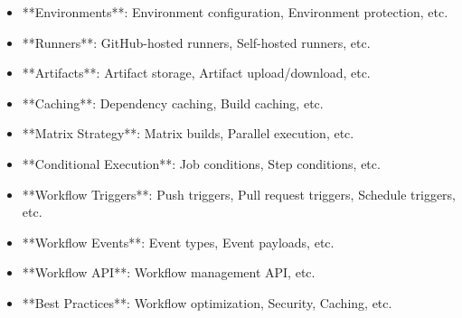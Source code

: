 \documentclass[11pt,a4paper]{article}
\begin{document}
\begin{itemize}
\item **Environments**: Environment configuration, Environment protection, etc.
\end{itemize}

\begin{itemize}
\item **Runners**: GitHub-hosted runners, Self-hosted runners, etc.
\end{itemize}

\begin{itemize}
\item **Artifacts**: Artifact storage, Artifact upload/download, etc.
\end{itemize}

\begin{itemize}
\item **Caching**: Dependency caching, Build caching, etc.
\end{itemize}

\begin{itemize}
\item **Matrix Strategy**: Matrix builds, Parallel execution, etc.
\end{itemize}

\begin{itemize}
\item **Conditional Execution**: Job conditions, Step conditions, etc.
\end{itemize}

\begin{itemize}
\item **Workflow Triggers**: Push triggers, Pull request triggers, Schedule triggers, etc.
\end{itemize}

\begin{itemize}
\item **Workflow Events**: Event types, Event payloads, etc.
\end{itemize}

\begin{itemize}
\item **Workflow API**: Workflow management API, etc.
\end{itemize}

\begin{itemize}
\item **Best Practices**: Workflow optimization, Security, Caching, etc.
\end{itemize}
\end{document}
